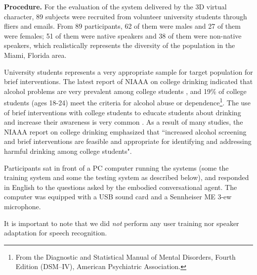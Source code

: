 \documentclass[letterpaper]{article}
\begin{document}
\begin{inparaenum}[1)]
{\bf Procedure.}  For the evaluation of the system delivered by the 3D virtual character, 89 subjects were recruited from volunteer university students through fliers and emails.  From 89 participants, 62 of them were males and 27 of them were females; 51 of them were native speakers and 38 of them were non-native speakers,   which realistically represents the diversity of the population in the Miami, Florida area.

University students represents a very appropriate sample for target population for brief interventions. The latest report of NIAAA on college drinking indicated that alcohol problems are very prevalent among college students \cite{NIAAA2007colleges}, and 19\% of college students (ages 18-24) meet the criteria for alcohol abuse or dependence\footnote{From the Diagnostic and Statistical Manual of Mental Disorders, Fourth Edition (DSM–IV), American Psychiatric Association.}. The use of brief interventions with college students to educate students about drinking and  increase their awareness is very common \cite{NIAAA2007colleges}. As a result of many studies, the NIAAA report on college drinking emphasized that ``increased alcohol screening and brief interventions are feasible  and appropriate for identifying and addressing harmful drinking among college students". 

Participants sat in front of a PC computer running the systems (some the training system and some the testing system as described below), and responded in English to the questions asked by the embodied conversational agent.  The computer was equipped with a USB sound card and a Sennheiser ME 3-ew microphone.

It is important to note that we did {\em not} perform any user training nor speaker adaptation for speech recognition. 


\end{inparaenum}
\end{document}
